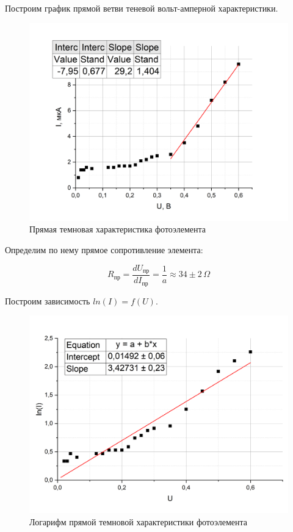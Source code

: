 \documentclass[a4paper,12pt]{article} %
\begin{document}
Построим график прямой ветви теневой вольт-амперной характеристики.

\begin{figure}[h!]
    \centering
    \includegraphics[scale=0.5]{прямая темновая.png}
    \caption{Прямая темновая характеристика фотоэлемента}
\end{figure}


Определим по нему прямое сопротивление элемента:

\[
R_{\text{пр}} = \frac{dU_{\text{пр}}}{dI_{\text{пр}}} = \frac{1}{a} \approx 34 \pm 2 \, \Omega
\]

Построим зависимость $ln(I)=f(U)$.

\begin{figure}[h!]
    \centering
    \includegraphics[scale=0.5]{пр темн лог.png}
    \caption{Логарифм прямой темновой характеристики фотоэлемента}
\end{figure}
\end{document}

